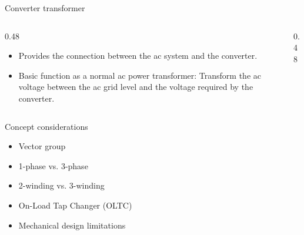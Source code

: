 
\begin{frame}{Converter transformer}
  \begin{columns}[c,onlytextwidth]
    \begin{column}{0.48\textwidth}
      \begin{itemize}
        \setlength{\itemsep}{0.45em}
        \item Provides the connection between the ac system and the converter.
        \item Basic function as a normal ac power transformer: Transform the
              ac voltage between the ac grid level and the voltage required
              by the converter.
      \end{itemize}
    \end{column}
    \begin{column}{0.48\textwidth}
      \centering
    \end{column}
  \end{columns}
\end{frame}

\begin{frame}{Concept considerations}
  \begin{itemize}
    \setlength{\itemsep}{0.3em}
    \item Vector group
    \item 1-phase vs. 3-phase
    \item 2-winding vs. 3-winding
    \item On-Load Tap Changer (OLTC)
    \item Mechanical design limitations
  \end{itemize}
\end{frame}

